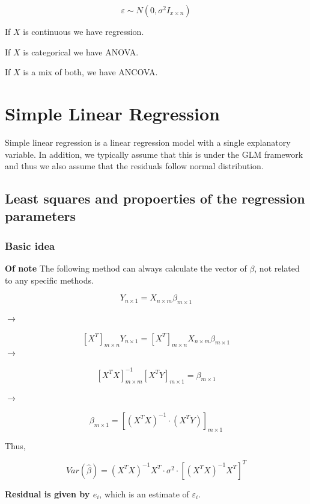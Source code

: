\documentclass[]{book}
\begin{document}
\[\varepsilon \sim N(0, \sigma^2I_{x \times n})\]

If \(X\) is continuous we have regression.

If \(X\) is categorical we have ANOVA.

If \(X\) is a mix of both, we have ANCOVA.

\hypertarget{simple-linear-regression}{%
\section{Simple Linear Regression}\label{simple-linear-regression}}

Simple linear regression is a linear regression model with a single explanatory variable. In addition, we typically assume that this is under the GLM framework and thus we also assume that the residuals follow normal distribution.

\hypertarget{least-squares-and-propoerties-of-the-regression-parameters}{%
\subsection{Least squares and propoerties of the regression parameters}\label{least-squares-and-propoerties-of-the-regression-parameters}}

\hypertarget{basic-idea}{%
\subsubsection{Basic idea}\label{basic-idea}}

\textbf{Of note} The following method can always calculate the vector of \(\beta\), not related to any specific methods.

\[Y_{n \times 1}=X_{n\times m}\beta_{m \times 1}\]

\(\rightarrow\)

\[[X^T]_{m \times n}Y_{n \times 1}=[X^T]_{m \times n}X_{n\times m}\beta_{m \times 1}\]
\(\rightarrow\)

\[[X^TX]^{-1}_{m\times m}[X^TY]_{m \times 1}=\beta_{m \times 1}\]

\(\rightarrow\)

\[\beta_{m \times 1}=[(X^TX)^{-1} \cdot (X^TY)]_{m \times 1}\]

Thus,

\[Var(\hat{\beta})=(X^TX)^{-1}X^T \cdot \sigma^2 \cdot [(X^TX)^{-1}X^T]^T\]

\textbf{Residual is given by \(e_i\)}, which is an estimate of \(\varepsilon_i\).
\end{document}
